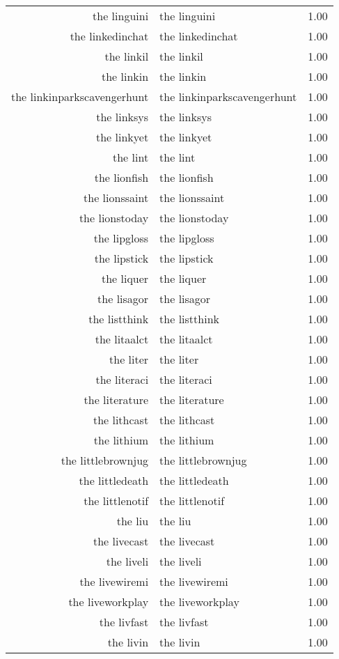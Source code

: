 \begin{table}[ht]
\begin{tabular}{rlr}
  the linguini & the linguini & 1.00 \\ 
  the linkedinchat & the linkedinchat & 1.00 \\ 
  the linkil & the linkil & 1.00 \\ 
  the linkin & the linkin & 1.00 \\ 
  the linkinparkscavengerhunt & the linkinparkscavengerhunt & 1.00 \\ 
  the linksys & the linksys & 1.00 \\ 
  the linkyet & the linkyet & 1.00 \\ 
  the lint & the lint & 1.00 \\ 
  the lionfish & the lionfish & 1.00 \\ 
  the lionssaint & the lionssaint & 1.00 \\ 
  the lionstoday & the lionstoday & 1.00 \\ 
  the lipgloss & the lipgloss & 1.00 \\ 
  the lipstick & the lipstick & 1.00 \\ 
  the liquer & the liquer & 1.00 \\ 
  the lisagor & the lisagor & 1.00 \\ 
  the listthink & the listthink & 1.00 \\ 
  the litaalct & the litaalct & 1.00 \\ 
  the liter & the liter & 1.00 \\ 
  the literaci & the literaci & 1.00 \\ 
  the literature & the literature & 1.00 \\ 
  the lithcast & the lithcast & 1.00 \\ 
  the lithium & the lithium & 1.00 \\ 
  the littlebrownjug & the littlebrownjug & 1.00 \\ 
  the littledeath & the littledeath & 1.00 \\ 
  the littlenotif & the littlenotif & 1.00 \\ 
  the liu & the liu & 1.00 \\ 
  the livecast & the livecast & 1.00 \\ 
  the liveli & the liveli & 1.00 \\ 
  the livewiremi & the livewiremi & 1.00 \\ 
  the liveworkplay & the liveworkplay & 1.00 \\ 
  the livfast & the livfast & 1.00 \\ 
  the livin & the livin & 1.00 \\ 

\end{tabular}
\end{table}
